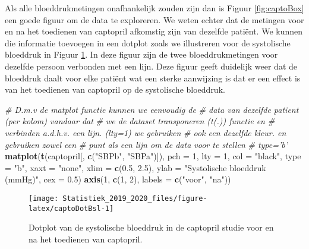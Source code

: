 \documentclass[12pt,dutch,coursenotes]{book}
\newenvironment{Shaded}{\begin{snugshade}}{\end{snugshade}}
\newcommand{\KeywordTok}[1]{\textcolor[rgb]{0.13,0.29,0.53}{\textbf{#1}}}
\newcommand{\DataTypeTok}[1]{\textcolor[rgb]{0.13,0.29,0.53}{#1}}
\newcommand{\DecValTok}[1]{\textcolor[rgb]{0.00,0.00,0.81}{#1}}
\newcommand{\FloatTok}[1]{\textcolor[rgb]{0.00,0.00,0.81}{#1}}
\newcommand{\StringTok}[1]{\textcolor[rgb]{0.31,0.60,0.02}{#1}}
\newcommand{\CommentTok}[1]{\textcolor[rgb]{0.56,0.35,0.01}{\textit{#1}}}
\newcommand{\NormalTok}[1]{#1}
\theoremstyle{definition}
\theoremstyle{definition}
\theoremstyle{definition}
\theoremstyle{remark}
\begin{document}
Als alle bloeddrukmetingen onafhankelijk zouden zijn dan is Figuur
\ref{fig:captoBox} een goede figuur om de data te exploreren. We weten
echter dat de metingen voor en na het toedienen van captopril afkomstig
zijn van dezelfde patiënt. We kunnen die informatie toevoegen in een
dotplot zoals we illustreren voor de systolische bloeddruk in Figuur
\ref{fig:captoDotBsl}. In deze figuur zijn de twee bloeddrukmetingen
voor dezelfde persoon verbonden met een lijn. Deze figuur geeft
duidelijk weer dat de bloeddruk daalt voor elke patiënt wat een sterke
aanwijzing is dat er een effect is van het toedienen van captopril op de
systolische bloeddruk.

\begin{Shaded}
\begin{Highlighting}[]
\CommentTok{# D.m.v de matplot functie kunnen we eenvoudig de}
\CommentTok{# data van dezelfde patient (per kolom) vandaar dat}
\CommentTok{# we de dataset transponeren (t(.)) functie en}
\CommentTok{# verbinden a.d.h.v. een lijn. (lty=1) we gebruiken}
\CommentTok{# ook een dezelfde kleur. en gebruiken zowel een}
\CommentTok{# punt als een lijn om de data voor te stellen}
\CommentTok{# type='b'}
\KeywordTok{matplot}\NormalTok{(}\KeywordTok{t}\NormalTok{(captopril[, }\KeywordTok{c}\NormalTok{(}\StringTok{"SBPb"}\NormalTok{, }\StringTok{"SBPa"}\NormalTok{)]), }\DataTypeTok{pch =} \DecValTok{1}\NormalTok{, }
    \DataTypeTok{lty =} \DecValTok{1}\NormalTok{, }\DataTypeTok{col =} \StringTok{"black"}\NormalTok{, }\DataTypeTok{type =} \StringTok{"b"}\NormalTok{, }\DataTypeTok{xaxt =} \StringTok{"none"}\NormalTok{, }
    \DataTypeTok{xlim =} \KeywordTok{c}\NormalTok{(}\FloatTok{0.5}\NormalTok{, }\FloatTok{2.5}\NormalTok{), }\DataTypeTok{ylab =} \StringTok{"Systolische bloeddruk (mmHg)"}\NormalTok{, }
    \DataTypeTok{cex =} \FloatTok{0.5}\NormalTok{)}
\KeywordTok{axis}\NormalTok{(}\DecValTok{1}\NormalTok{, }\KeywordTok{c}\NormalTok{(}\DecValTok{1}\NormalTok{, }\DecValTok{2}\NormalTok{), }\DataTypeTok{labels =} \KeywordTok{c}\NormalTok{(}\StringTok{"voor"}\NormalTok{, }\StringTok{"na"}\NormalTok{))}
\end{Highlighting}
\end{Shaded}

\begin{figure}

{\centering \texttt{[image: Statistiek\_2019\_2020\_files/figure-latex/captoDotBsl-1]} 

}

\caption{Dotplot van de systolische bloeddruk in de captopril studie voor en na het toedienen van captopril.}\label{fig:captoDotBsl}
\end{figure}
\end{document}
